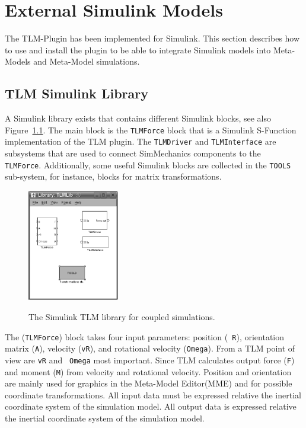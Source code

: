 \chapter{External Simulink Models}
The TLM-Plugin has been implemented for Simulink. This
section describes how to use and install the plugin to be able to
integrate Simulink models into Meta-Models and Meta-Model simulations.

\section{TLM Simulink Library}
\label{sec:TLMLib}
A Simulink library exists that contains different Simulink blocks, see
also Figure~\ref{fig:TLMLib}. The main block is the {\tt TLMForce}
block that is a Simulink S-Function implementation of the TLM
plugin. The {\tt TLMDriver} and {\tt TLMInterface} are subsystems that
are used to connect SimMechanics components to the {\tt
TLMForce}. Additionally, some useful Simulink blocks are collected in
the {\tt TOOLS} sub-system, for instance, blocks for matrix
transformations.

\begin{figure}[ht]\begin{center}
   {\includegraphics[width=4cm]{figs/TLMLib.png}}
    \caption{The Simulink TLM library for coupled simulations.}
    \label{fig:TLMLib}
\end{center}\end{figure}

The ({\tt TLMForce}) block takes four input parameters: position ({\tt
R}), orientation matrix ({\tt A}), velocity ({\tt vR}), and rotational
velocity ({\tt Omega}). From a TLM point of view are {\tt vR} and {\tt
Omega} most important. Since TLM calculates output force ({\tt F}) and
moment ({\tt M}) from velocity and rotational velocity. Position and
orientation are mainly used for graphics in the Meta-Model Editor(MME)
and for possible coordinate transformations. All input data must be
expressed relative the inertial coordinate system of the simulation
model. All output data is expressed relative the inertial coordinate
system of the simulation model.

